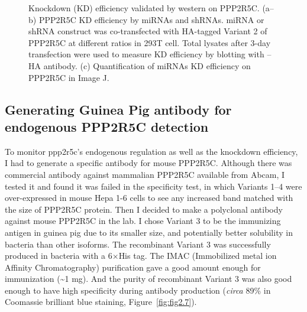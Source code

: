 \begin{figure}[htbp]
\begin{subfigure}[t]{1\textwidth}
    \label{fig:fig2.6c}
	\end{subfigure}
\caption[shRNA/miRNA KD efficiency on PPP2R5C protein level]{\footnotesize Knockdown (KD) efficiency validated by western on PPP2R5C. (a--b) PPP2R5C KD efficiency by miRNAs and shRNAs. miRNA or shRNA construct was co-transfected with HA-tagged Variant 2 of PPP2R5C at different ratios in 293T cell. Total lysates after 3-day transfection were used to measure KD efficiency by blotting with \textalpha{}--HA antibody. (c) Quantification of miRNAs KD efficiency on PPP2R5C in Image J. }
\label{fig:fig2.6}
\end{figure}


\subsection{Generating Guinea Pig antibody for endogenous PPP2R5C detection}\label{sec:sec222}

To monitor \gls{ppp2r5c}'s endogenous regulation as well as the knockdown efficiency, I had to generate a specific antibody for mouse PPP2R5C. Although there was commercial antibody against mammalian PPP2R5C available from Abcam, I tested it and found it was failed in the specificity test, in which Variants 1--4 were over-expressed in mouse Hepa 1-6 cells to see any increased band matched with the size of PPP2R5C protein. Then I decided to make a polyclonal antibody against mouse PPP2R5C in the lab. I chose Variant 3 to be the immunizing antigen in guinea pig due to its smaller size, and potentially better solubility in bacteria than other isoforms. The recombinant Variant 3 was successfully produced in bacteria with a 6$\times$His tag. The IMAC (Immobilized metal ion Affinity Chromatography) purification gave a good amount enough for immunization (\textasciitilde1 mg). And the purity of recombinant Variant 3 was also good enough to have high specificity during antibody production (\textit{circa} 89\% in Coomassie brilliant blue staining, Figure~\ref{fig:fig2.7}). 

